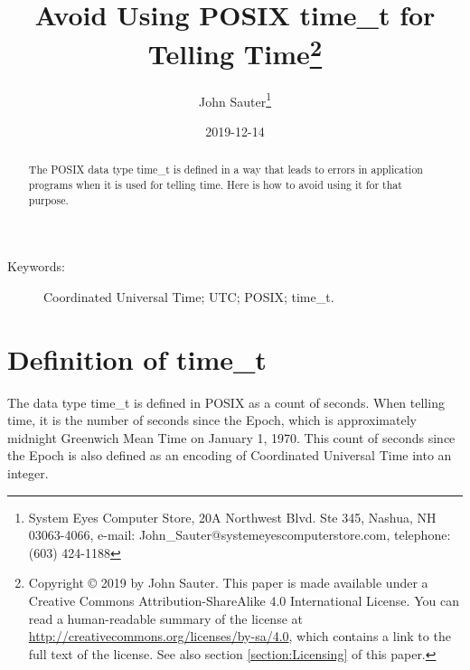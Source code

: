 \documentclass[letterpaper,twoside]{article}
\begin{document}
\title{Avoid Using POSIX {\ttfamily time\_t} for Telling
  Time\footnote{Copyright
    {\copyright} 2019 by John Sauter.
    This paper is made available under a
    Creative Commons Attribution-ShareAlike 4.0 International License.
    You can read a human-readable summary of the license at
    \url{http://creativecommons.org/licenses/by-sa/4.0}, which contains
    a link to the full text of the license.
    See also section \ref{section:Licensing} of this paper.}
}
\author{John Sauter\footnote{
    System Eyes Computer Store,
    20A Northwest Blvd.  Ste 345,
    Nashua, NH  03063-4066,
    e-mail: John\_Sauter@systemeyescomputerstore.com,
    telephone: (603) 424-1188}}
\date{2019-12-14}
\maketitle
\begin{abstract}
  The POSIX data type {\ttfamily time\_t} is defined in a way that leads
  to errors in application programs when it is used for telling time.
  Here is how to avoid using it for that purpose.
\end{abstract}
\begin{description}
\item[Keywords:]Coordinated Universal Time; UTC; POSIX; time\_t.
\end{description}
  
\newpage

\section{Definition of {\ttfamily time\_t}}
The data type {\ttfamily time\_t} is defined in POSIX\citep{7582338}
as a count of seconds.
When telling time, it is the number of seconds
since the Epoch, which is approximately midnight Greenwich Mean Time on
January 1, 1970.  This count of seconds since the Epoch is also
defined as an encoding of Coordinated Universal Time into an integer.
\end{document}
